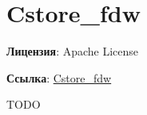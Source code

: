 \section{Cstore\_fdw}
\textbf{Лицензия}: Apache License

\textbf{Ссылка}: \href{http://citusdata.github.io/cstore\_fdw/}{Cstore\_fdw}

TODO